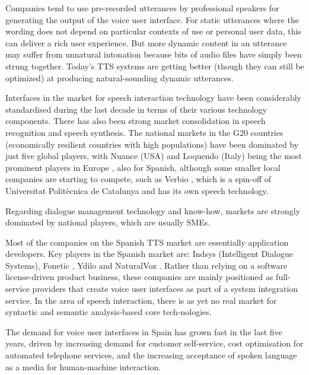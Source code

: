 \begin{multicols}{2}
Companies tend to use pre-recorded utterances by professional speakers for generating the output of the voice user interface. For static utterances where the wording does not depend on particular contexts of use or personal user data, this can deliver a rich user experience. But more dynamic content in an utterance may suffer from unnatural intonation because bits of audio files have simply been strung together. Today’s TTS systems are getting better (though they can still be optimized) at producing natural-sounding dynamic utterances.  

Interfaces in the market for speech interaction technology have been considerably standardised during the last decade in terms of their various technology components. There has also been strong market consolidation in speech recognition and speech synthesis. The national markets in the G20 countries (economically resilient countries with high populations) have been dominated by just five global players, with Nuance (USA) and Loquendo (Italy) being the most prominent players in Europe , also for Spanish, although some smaller local companies are starting to compete, such as Verbio , which is a spin-off of Universitat Politècnica de Catalunya and has its own speech technology. 

Regarding dialogue management technology and know-how, markets are strongly dominated by national players, which are usually SMEs.

Most of the companies on the Spanish TTS market are essentially application developers. Key players in the Spanish market are: Indsys  (Intelligent Dialogue Systems), Fonetic , Ydilo  and NaturalVoz . Rather than relying on a software license-driven product business, these companies are mainly positioned as full-service providers that create voice user interfaces as part of a system integration service. In the area of speech interaction, there is as yet no real market for syntactic and semantic analysis-based core tech-nologies.


The demand for voice user interfaces in Spain has grown fast in the last five years, driven by increasing demand for customer self-service, cost optimisation for automated telephone services, and the increasing acceptance of spoken language as a media for human-machine interaction. 


\end{multicols}
